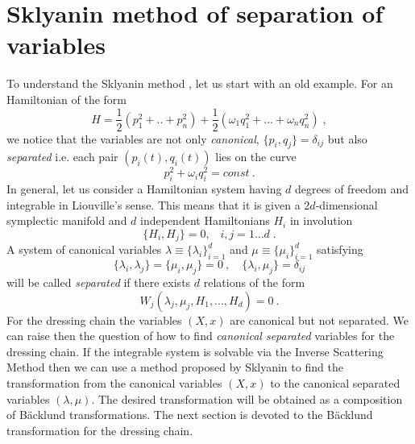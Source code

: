 \documentclass[a4paper,11pt]{article}
\begin{document}
\section{Sklyanin method of separation of variables}
To understand the Sklyanin method \cite{Sklyanin1,Sklyanin2,Sklyanin3,Kuz},
let us start with an old example. For an Hamiltonian of the form
\begin{equation}
\label{oldHam}
H=\frac{1}{2}(p_1^2+..+p_n^2)+\frac{1}{2}(\omega_1q_1^2+...+\omega_nq_n^2)\;,
\end{equation}
we notice that the variables are not only {\it canonical},
$\{p_i,q_j\}=\delta_ {ij}$ but also {\it separated} i.e. each pair
$(p_i(t),q_i(t))$ lies on the curve
\begin{equation}
\label{curve}
p_i^2+\omega_iq_i^2=const ~.
\end{equation}
In general, let us consider a Hamiltonian system having $d$ degrees of
freedom and integrable in Liouville's sense. This means that it is given a
$2d$-dimensional symplectic manifold and $d$ independent Hamiltonians $H_i$
in involution
\begin{equation}
\label{H_inv}
\{H_i,H_j\}=0,\;\;\;i,j=1 \ldots d\;.
\end{equation}
A system of canonical variables $\lambda\equiv \{\lambda_i\}_{i=1}^d$ and
$\mu\equiv \{\mu_i\}_{i=1}^d$ satisfying
\begin{equation}
\label{Candeg}
\{\lambda_i,\lambda_j\}=\{\mu_i,\mu_j\}=0~, \quad \{\lambda_i,\mu_j\}=\delta_{ij}
\end{equation}
will be called {\it separated} if there exists $d$ relations of the form
\begin{equation}
\label{sep}
W_j(\lambda_j,\mu_j,H_1,...,H_d)=0 ~.
\end{equation}
For the dressing chain the variables $(X,x)$ are canonical but not
separated. We can raise then the question of how to find {\it canonical
separated} variables for the dressing chain. If the integrable system is
solvable via the Inverse Scattering Method then we can use a method proposed
by Sklyanin to find the transformation from the canonical variables $(X,x)$
to the canonical separated variables $(\lambda,\mu)$. The desired
transformation will be obtained as a composition of B\"acklund
transformations. The next section is devoted to the B\"acklund
transformation for the dressing chain.
\end{document}
